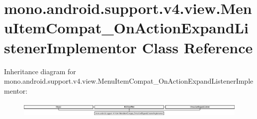 \hypertarget{classmono_1_1android_1_1support_1_1v4_1_1view_1_1MenuItemCompat__OnActionExpandListenerImplementor}{}\section{mono.\+android.\+support.\+v4.\+view.\+Menu\+Item\+Compat\+\_\+\+On\+Action\+Expand\+Listener\+Implementor Class Reference}
\label{classmono_1_1android_1_1support_1_1v4_1_1view_1_1MenuItemCompat__OnActionExpandListenerImplementor}
Inheritance diagram for mono.\+android.\+support.\+v4.\+view.\+Menu\+Item\+Compat\+\_\+\+On\+Action\+Expand\+Listener\+Implementor\+:\begin{figure}[H]
\begin{center}
\leavevmode
\includegraphics[height=0.739274cm]{classmono_1_1android_1_1support_1_1v4_1_1view_1_1MenuItemCompat__OnActionExpandListenerImplementor}
\end{center}
\end{figure}
